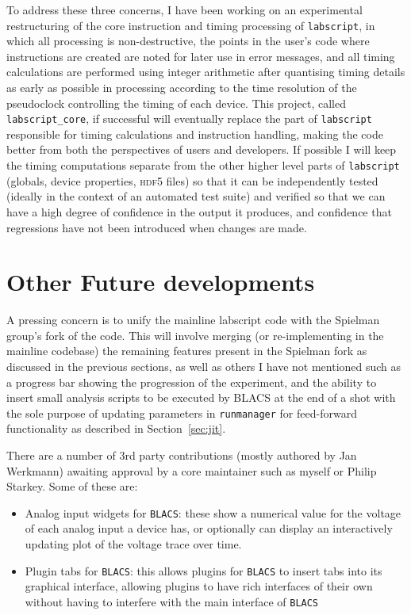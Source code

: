 To address these three concerns, I have been working on an experimental restructuring of the core instruction and timing processing of \texttt{labscript}, in which all processing is non-destructive, the points in the user's code where instructions are created are noted for later use in error messages, and all timing calculations are performed using integer arithmetic after quantising timing details as early as possible in processing according to the time resolution of the pseudoclock controlling the timing of each device. This project, called \texttt{labscript\_core}, if successful will eventually replace the part of \texttt{labscript} responsible for timing calculations and instruction handling, making the code better from both the perspectives of users and developers. If possible I will keep the timing computations separate from the other higher level parts of \texttt{labscript} (globals, device properties, \textsc{hdf5} files) so that it can be independently tested (ideally in the context of an automated test suite) and verified so that we can have a high degree of confidence in the output it produces, and confidence that regressions have not been introduced when changes are made.


\section{Other Future developments}

A pressing concern is to unify the mainline labscript code with the Spielman group's fork of the code. This will involve merging (or re-implementing in the mainline codebase) the remaining features present in the Spielman fork as discussed in the previous sections, as well as others I have not mentioned such as a progress bar showing the progression of the experiment, and the ability to insert small analysis scripts to be executed by BLACS at the end of a shot with the sole purpose of updating parameters in \texttt{runmanager} for feed-forward functionality as described in Section~\ref{sec:jit}.

There are a number of 3rd party contributions (mostly authored by Jan Werkmann) awaiting approval by a core maintainer such as myself or Philip Starkey. Some of these are:
\begin{itemize}
    \item Analog input widgets for \texttt{BLACS}: these show a numerical value for the voltage of each analog input a device has, or optionally can display an interactively updating plot of the voltage trace over time.
    \item Plugin tabs for \texttt{BLACS}: this allows plugins for \texttt{BLACS} to insert tabs into its graphical interface, allowing plugins to have rich interfaces of their own without having to interfere with the main interface of \texttt{BLACS}
\end{itemize}

